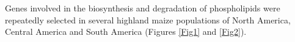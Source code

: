 \documentclass[9pt,twocolumn,twoside,lineno]{BioRxiv}
\begin{document}

Genes involved in the biosynthesis and degradation of phospholipids were repeatedly selected in several highland maize populations of North America, Central America and South America (Figures \ref{Fig1} and \ref{Fig2}). 
\end{document}
